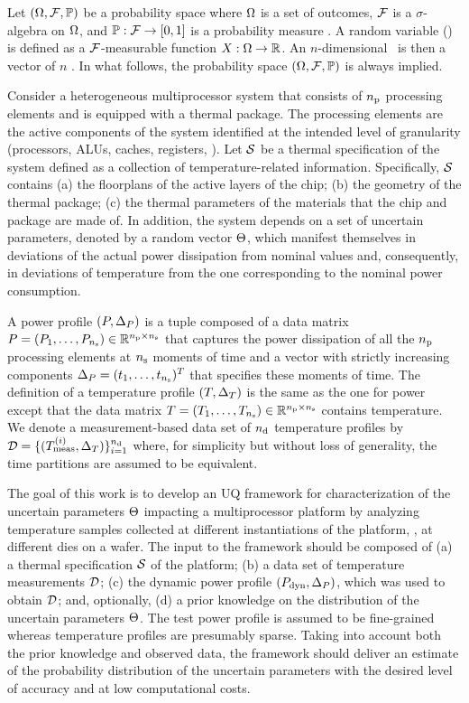 Let $(\Omega, \mathcal{F}, \mathbb{P})$ be a probability space where $\Omega$ is a set of outcomes, $\mathcal{F}$ is a $\sigma$-algebra on $\Omega$, and $\mathbb{P}: \mathcal{F} \to [0, 1]$ is a probability measure \cite{durrett2010}. A random variable (\rv) is defined as a $\mathcal{F}$-measurable function $X: \Omega \to \mathbb{R}$. An $n$-dimensional \rv\ is then a vector of $n$ \rvs. In what follows, the probability space $(\Omega, \mathcal{F}, \mathbb{P})$ is always implied.

Consider a heterogeneous multiprocessor system that consists of ${n_\text{p}}$ processing elements and is equipped with a thermal package. The processing elements are the active components of the system identified at the intended level of granularity (processors, ALUs, caches, registers, \etc). Let $\mathcal{S}$ be a thermal specification of the system defined as a collection of temperature-related information. Specifically, $\mathcal{S}$ contains (a) the floorplans of the active layers of the chip; (b) the geometry of the thermal package; (c) the thermal parameters of the materials that the chip and package are made of. In addition, the system depends on a set of uncertain parameters, denoted by a random vector $\Theta$, which manifest themselves in deviations of the actual power dissipation from nominal values and, consequently, in deviations of temperature from the one corresponding to the nominal power consumption.

A power profile $\profileP$ is a tuple composed of a data matrix $P = \left(P_1, \dotsc, P_{n_\text{s}} \right) \in \mathbb{R}^{{n_\text{p}} \times n_\text{s}}$ that captures the power dissipation of all the ${n_\text{p}}$ processing elements at $n_\text{s}$ moments of time and a vector with strictly increasing components $\partition{\mP} = (\t_1, \dotsc, \t_{\nsteps})^T$ that specifies these moments of time. The definition of a temperature profile $\profileT$ is the same as the one for power except that the data matrix $T = \left( T_1, \dots, T_{n_\text{s}} \right) \in \mathbb{R}^{{n_\text{p}} \times n_\text{s}}$ contains temperature. We denote a measurement-based data set of $n_\text{d}$ temperature profiles by $\data = \{ (\mT^{(i)}_\meas, \partition{\mT}) \}_{i = 1}^{\ndata}$ where, for simplicity but without loss of generality, the time partitions are assumed to be equivalent.

The goal of this work is to develop an UQ framework for characterization of the uncertain parameters $\Theta$ impacting a multiprocessor platform by analyzing temperature samples collected at different instantiations of the platform, \eg, at different dies on a wafer. The input to the framework should be composed of (a) a thermal specification $\mathcal{S}$ of the platform; (b) a data set of temperature measurements $\mathcal{D}$; (c) the dynamic power profile $\profilePdyn$, which was used to obtain $\mathcal{D}$; and, optionally, (d) a prior knowledge on the distribution of the uncertain parameters $\Theta$. The test power profile is assumed to be fine-grained whereas temperature profiles are presumably sparse. Taking into account both the prior knowledge and observed data, the framework should deliver an estimate of the probability distribution of the uncertain parameters with the desired level of accuracy and at low computational costs.
